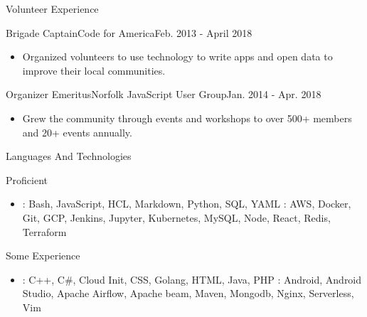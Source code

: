 \documentclass[]{mcdowellcv}
\begin{document}
    \begin{cvsection}{Volunteer Experience}
        \begin{cvsubsection}{Brigade Captain}{Code for America}{Feb. 2013 - April 2018}
            \begin{itemize}
                \item Organized volunteers to use technology to write apps and open data to improve their local communities.
            \end{itemize}

        \end{cvsubsection}

        \begin{cvsubsection}{Organizer Emeritus}{Norfolk JavaScript User Group}{Jan. 2014 - Apr. 2018}
            \begin{itemize}
                \item Grew the community through events and workshops to over 500+ members and 20+ events annually.
            \end{itemize}
        \end{cvsubsection}
    \end{cvsection}

    \begin{cvsection}{Languages And Technologies}
        \begin{cvsubsection}{Proficient}{}{}
            \begin{itemize}
                    \item {}: Bash, JavaScript, HCL, Markdown, Python, SQL, YAML \newline
                    : AWS, Docker, Git, GCP, Jenkins, Jupyter, Kubernetes, MySQL, Node, React, Redis, Terraform
            \end{itemize}
        \end{cvsubsection}
        \begin{cvsubsection}{Some Experience}{}{}
            \begin{itemize}
                    \item {}: C++, C\#, Cloud Init, CSS, Golang, HTML, Java, PHP  \newline
                    : Android, Android Studio, Apache Airflow, Apache beam, Maven, Mongodb, Nginx, Serverless, Vim
            \end{itemize}
        \end{cvsubsection}

    \end{cvsection}
\end{document}
